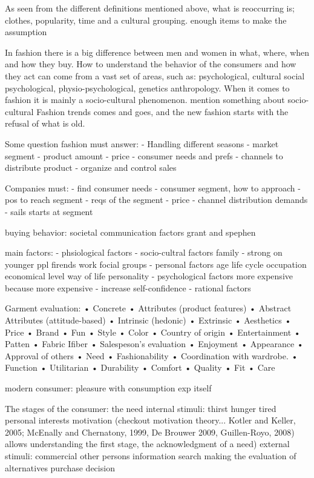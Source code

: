 As seen from the different definitions mentioned above, what is reoccurring is;
clothes, popularity, time and a cultural grouping. %
enough items to make the assumption

In fashion there is a big difference between men and women in what, where, when
and how they buy.  How to understand the behavior of the consumers and how they
act can come from a vast set of areas, such as: psychological, cultural social
psychological, physio-psychological, genetics anthropology.
When it comes to fashion it is mainly a socio-cultural phenomenon. %
mention something about socio-cultural Fashion trends comes and goes, and the
new fashion starts with the refusal of what is old.

Some question fashion must answer:
    - Handling different seasons
    - market segment
    - product amount
    - price
    - consumer needs and prefs
    - channels to distribute product
    - organize and control sales

Companies must:
- find consumer needs
- consumer segment, how to approach
- pos to reach segment
- reqs of the segment
- price
- channel distribution demands
- sails starts at segment

buying behavior:
societal communication factors grant and spephen

main factors:
- phsiological factors
- socio-cultral factors
    family - strong on younger ppl
    firends
    work
    focial groups
- personal factors
    age
    life cycle
    occupation
    economical level
    way of life
    personality
- psychological factors
    more expensive because more expensive - increase self-confidence
- rational factors

Garment evaluation:
• Concrete
• Attributes (product features)
• Abstract Attributes (attitude-based)
• Intrinsic (hedonic)
• Extrinsic
• Aesthetics
• Price
• Brand
• Fun
• Style
• Color
• Country of origin
• Entertainment
• Patten
• Fabric Ifiber
• Salespeson's evaluation
• Enjoyment
• Appearance
• Approval of others
• Need
• Fashionability
• Coordination with wardrobe.
• Function
• Utilitarian
• Durability
• Comfort
• Quality
• Fit
• Care

modern consumer: pleasure with consumption exp itself

The stages of the consumer:
	the need
		internal stimuli:
			thirst
			hunger
			tired
			personal interests
      motivation (checkout motivation theory... Kotler and Keller, 2005;
      McEnally and Chernatony, 1999, De Brouwer 2009, Guillen-Royo, 2008)
      allows understanding the first stage, the acknowledgment of a need)
    external stimuli:
			commercial
			other persons
	information search
	making the evaluation of alternatives
	purchase decision

